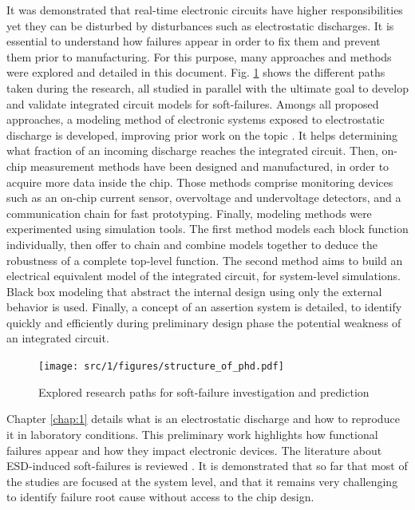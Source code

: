 It was demonstrated that real-time electronic circuits have higher responsibilities yet they can be disturbed by disturbances such as electrostatic discharges.
It is essential to understand how failures appear in order to fix them and prevent them prior to manufacturing.
For this purpose, many approaches and methods were explored and detailed in this document.
Fig. \ref{fig:phd-map} shows the different paths taken during the research, all studied in parallel with the ultimate goal to develop and validate integrated circuit models for soft-failures.
Amongs all proposed approaches, a modeling method of electronic systems exposed to electrostatic discharge is developed, improving prior work on the topic \cite{phd-lacrampe, phd-monnereau}.
It helps determining what fraction of an incoming discharge reaches the integrated circuit.
Then, on-chip measurement methods have been designed and manufactured, in order to acquire more data inside the chip.
Those methods comprise monitoring devices such as an on-chip current sensor, overvoltage and undervoltage detectors, and a communication chain for fast prototyping.
Finally, modeling methods were experimented using simulation tools.
The first method models each block function individually, then offer to chain and combine models together to deduce the robustness of a complete top-level function.
The second method aims to build an electrical equivalent model of the integrated circuit, for system-level simulations.
Black box modeling that abstract the internal design using only the external behavior is used.
Finally, a concept of an assertion system is detailed, to identify quickly and efficiently during preliminary design phase the potential weakness of an integrated circuit.

\begin{figure}[!h]
  \centering
  \texttt{[image: src/1/figures/structure\_of\_phd.pdf]}
  \caption{Explored research paths for soft-failure investigation and prediction}
  \label{fig:phd-map}
\end{figure}

%
Chapter \ref{chap:1} details what is an electrostatic discharge and how to reproduce it in laboratory conditions.
This preliminary work highlights how functional failures appear and how they impact electronic devices.
The literature about ESD-induced soft-failures is reviewed .
It is demonstrated that so far that most of the studies are focused at the system level, and that it remains very challenging to identify failure root cause without access to the chip design.

